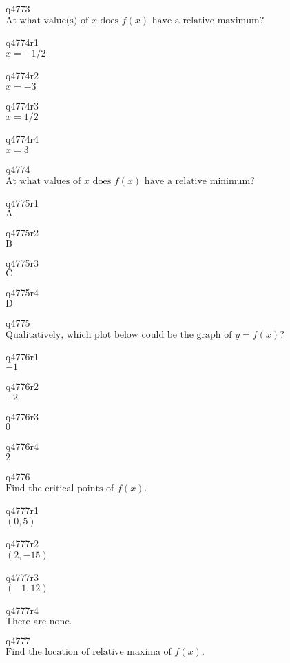 q4773\\
\(\displaystyle \text{At what value(s) of } x \text{ does } f(x) \text{ have a relative maximum?} \)

q4774r1\\
\(\displaystyle x = -1/2 \)

q4774r2\\
\(\displaystyle x = -3 \)

q4774r3\\
\(\displaystyle x = 1/2 \)

q4774r4\\
\(\displaystyle x = 3 \)

q4774\\
\(\displaystyle \text{At what values of } x \text{ does } f(x) \text{ have a relative minimum?} \)

q4775r1\\
\(\displaystyle \text{A} \)

q4775r2\\
\(\displaystyle \text{B} \)

q4775r3\\
\(\displaystyle \text{C} \)

q4775r4\\
\(\displaystyle \text{D} \)

q4775\\
\(\displaystyle \text{Qualitatively, which plot below could be the graph of } y = f(x)? \)

q4776r1\\
\(\displaystyle -1 \)

q4776r2\\
\(\displaystyle -2 \)

q4776r3\\
\(\displaystyle 0 \)

q4776r4\\
\(\displaystyle 2 \)

q4776\\
\(\displaystyle \text{Find the critical points of } f(x). \)

q4777r1\\
\(\displaystyle (0, 5) \)

q4777r2\\
\(\displaystyle (2, -15) \)

q4777r3\\
\(\displaystyle (-1, 12) \)

q4777r4\\
\(\displaystyle \text{There are none.} \)

q4777\\
\(\displaystyle \text{Find the location of relative maxima of } f(x). \)

